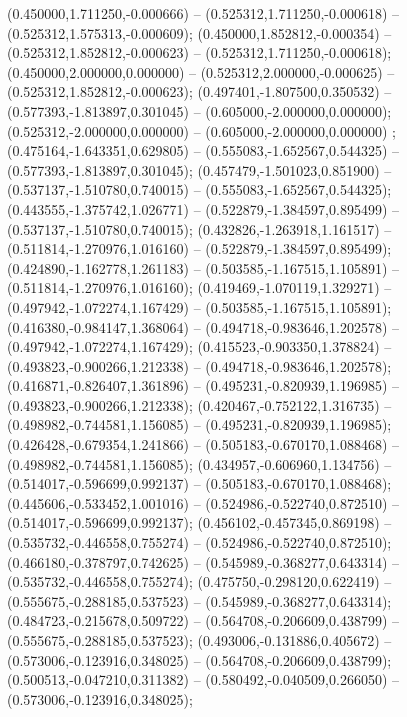  (0.450000,1.711250,-0.000666) -- (0.525312,1.711250,-0.000618) -- (0.525312,1.575313,-0.000609);
 (0.450000,1.852812,-0.000354) -- (0.525312,1.852812,-0.000623) -- (0.525312,1.711250,-0.000618);
 (0.450000,2.000000,0.000000) -- (0.525312,2.000000,-0.000625) -- (0.525312,1.852812,-0.000623);
 (0.497401,-1.807500,0.350532) -- (0.577393,-1.813897,0.301045) -- (0.605000,-2.000000,0.000000);
 (0.525312,-2.000000,0.000000) -- (0.605000,-2.000000,0.000000) ;
 (0.475164,-1.643351,0.629805) -- (0.555083,-1.652567,0.544325) -- (0.577393,-1.813897,0.301045);
 (0.457479,-1.501023,0.851900) -- (0.537137,-1.510780,0.740015) -- (0.555083,-1.652567,0.544325);
 (0.443555,-1.375742,1.026771) -- (0.522879,-1.384597,0.895499) -- (0.537137,-1.510780,0.740015);
 (0.432826,-1.263918,1.161517) -- (0.511814,-1.270976,1.016160) -- (0.522879,-1.384597,0.895499);
 (0.424890,-1.162778,1.261183) -- (0.503585,-1.167515,1.105891) -- (0.511814,-1.270976,1.016160);
 (0.419469,-1.070119,1.329271) -- (0.497942,-1.072274,1.167429) -- (0.503585,-1.167515,1.105891);
 (0.416380,-0.984147,1.368064) -- (0.494718,-0.983646,1.202578) -- (0.497942,-1.072274,1.167429);
 (0.415523,-0.903350,1.378824) -- (0.493823,-0.900266,1.212338) -- (0.494718,-0.983646,1.202578);
 (0.416871,-0.826407,1.361896) -- (0.495231,-0.820939,1.196985) -- (0.493823,-0.900266,1.212338);
 (0.420467,-0.752122,1.316735) -- (0.498982,-0.744581,1.156085) -- (0.495231,-0.820939,1.196985);
 (0.426428,-0.679354,1.241866) -- (0.505183,-0.670170,1.088468) -- (0.498982,-0.744581,1.156085);
 (0.434957,-0.606960,1.134756) -- (0.514017,-0.596699,0.992137) -- (0.505183,-0.670170,1.088468);
 (0.445606,-0.533452,1.001016) -- (0.524986,-0.522740,0.872510) -- (0.514017,-0.596699,0.992137);
 (0.456102,-0.457345,0.869198) -- (0.535732,-0.446558,0.755274) -- (0.524986,-0.522740,0.872510);
 (0.466180,-0.378797,0.742625) -- (0.545989,-0.368277,0.643314) -- (0.535732,-0.446558,0.755274);
 (0.475750,-0.298120,0.622419) -- (0.555675,-0.288185,0.537523) -- (0.545989,-0.368277,0.643314);
 (0.484723,-0.215678,0.509722) -- (0.564708,-0.206609,0.438799) -- (0.555675,-0.288185,0.537523);
 (0.493006,-0.131886,0.405672) -- (0.573006,-0.123916,0.348025) -- (0.564708,-0.206609,0.438799);
 (0.500513,-0.047210,0.311382) -- (0.580492,-0.040509,0.266050) -- (0.573006,-0.123916,0.348025);
